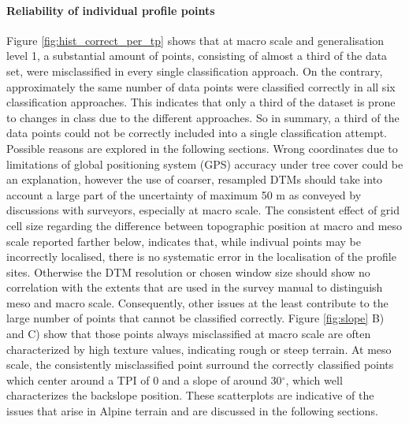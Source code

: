 \documentclass[preprint,12pt,authoryear]{elsarticle}
\begin{document}
\paragraph{Reliability of individual profile points} 
Figure \ref{fig:hist_correct_per_tp} shows that at macro scale and generalisation level 1, a substantial amount of points, consisting of almost a third of the data set, were misclassified in every single classification approach. On the contrary, approximately the same number of data points were classified correctly in all six classification approaches. This indicates that only a third of the dataset is prone to changes in class due to the different approaches. So in summary, a third of the data points could not be correctly included into a single classification attempt. Possible reasons are explored in the following sections. Wrong coordinates due to limitations of global positioning system (GPS) accuracy under tree cover could be an explanation, however the use of coarser, resampled DTMs should take into account a large part of the uncertainty of maximum 50 m as conveyed by discussions with surveyors, especially at macro scale. The consistent effect of grid cell size regarding the difference between topographic position at macro and meso scale reported farther below, indicates that, while indivual points may be incorrectly localised, there is no systematic error in the localisation of the profile sites. Otherwise the DTM resolution or chosen window size should show no correlation with the extents that are used in the survey manual to distinguish meso and macro scale. Consequently, other issues at the least contribute to the large number of points that cannot be classified correctly. Figure \ref{fig:slope} B) and C) show that those points always misclassified at macro scale are often characterized by high texture values, indicating rough or steep terrain. At meso scale, the consistently misclassified point surround the correctly classified points which center around a TPI of 0 and a slope of around 30$^{\circ}$, which well characterizes the backslope position. These scatterplots are indicative of the issues that arise in Alpine terrain and are discussed in the following sections.
\end{document}
